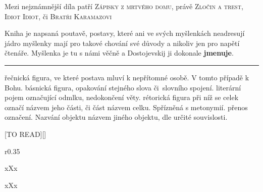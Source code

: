 \documentclass{extarticle} %
\begin{document}

\noindent 
Mezi nejznámnější díla patří \textsc{Zápisky z mrtvého domu}, právě \textsc{Zločin a trest}, \textsc{Idiot Idiot}, či \textsc{Bratři Karamazovi}






\noindent 
Kniha je napsaná poutavě, postavy, které ani ve svých myšlenkách neadresují jádro myšlenky mají pro takové chování své důvody a nikoliv jen pro napětí čtenáře.
Myšlenka je tu s námi věčně a Dostojevskij ji dokonale \textbf{jmenuje}.

\vfill

\noindent\begin{minipage}{\textwidth}
    {\textcolor{\wpagecolor}{\rule{\linewidth}{0.4pt}}
    \footnotesize
     řečnická figura, ve které postava mluví k nepřítomné osobě.
    V tomto případě k Bohu.
     básnická figura, opakování stejného slova či~slovního spojení. 
     literární pojem označující odmlku, nedokončení věty.
     rétorická figura při níž se celek označí názvem jeho části, či část názvem celku.
    Spřízněná s metonymií.
     přenos označení.
    Nazvání objektu názvem jiného objektu, dle určité souvislosti.
    }
\end{minipage}

\newpage


\changefontsize{8pt}

[TO READ][\killpage]

\noindent\begin{wrapfigure}{r}{0.35\textwidth}
\tiny

\setlength{\parindent}{3pt}
xXx
\end{wrapfigure}


\noindent xXx

\end{document}
